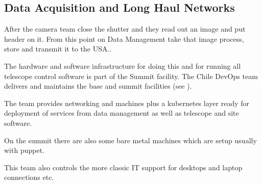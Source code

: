 \subsection{Data Acquisition and Long Haul Networks} \label{sec:devops}

After the camera team close the shutter and they read out an image and put header on it.
From this point on Data Management take that image process,  store  and transmit it to the USA..

The hardware and software infrastructure for doing this and for running all telescope control software is part of the Summit facility.
The Chile DevOps team delivers and maintains the base and summit facilities (see ).

The team provides networking and machines plus a kubernetes layer ready for deployment of services from data management as well as telescope and site software.

On the summit there are also some bare metal machines which are setup usually with puppet.

This team also controls the more classic IT support for desktops and laptop connections etc.

